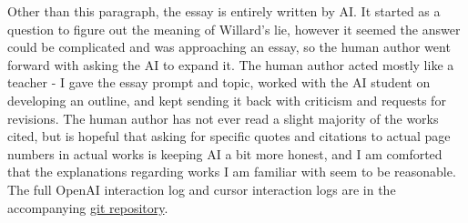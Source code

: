 Other than this paragraph, the essay is entirely written by AI.  It started as a question
to figure out the meaning of Willard's lie, however it seemed the answer could be complicated
and was approaching an essay, so the human author went forward with asking the AI to expand
it. The human author acted mostly like a teacher - I gave the essay prompt and topic, worked
with the AI student on developing an outline, and kept sending it back with criticism and
requests for revisions.  The human author has not ever read a slight majority of the works
cited, but is hopeful that asking for specific quotes and citations to actual page numbers
in actual works is keeping AI a bit more honest, and I am comforted that the explanations
regarding works I am familiar with seem to be reasonable.  The full OpenAI interaction log
and cursor interaction logs are in the accompanying
\href{https://github.com/jmalicki/apocalypse-now-essay/interaction-logs}{git repository}.
